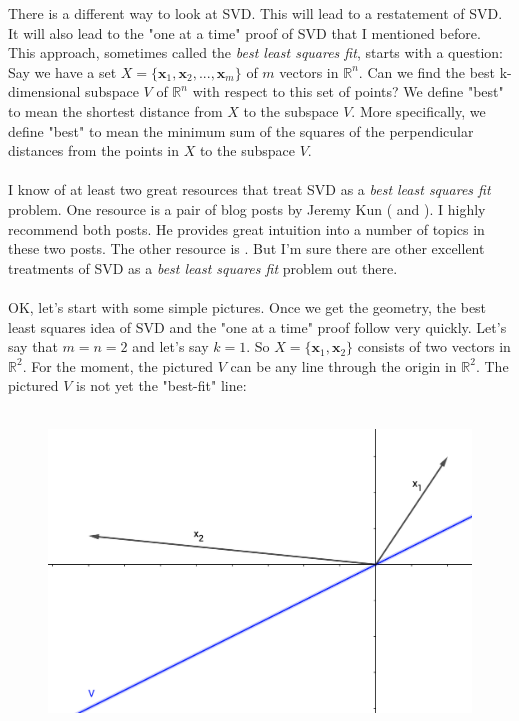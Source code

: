 \documentclass{tufte-handout}
\newcommand{\Waynehref}[3][blue]{\href{#2}{\color{#1}{#3}}}%
\begin{document}
\noindent There is a different way to look at SVD. This will lead to a restatement of SVD. It will also lead to the "one at a time" proof of SVD that I mentioned before. This approach, sometimes called the \textit{best least squares fit}, starts with a question: Say we have a set $X=\{\mathbf{x}_1, \mathbf{x}_2, ..., \mathbf{x}_m\}$ of $m$ vectors in $\mathbb{R}^n$. Can we find the best k-dimensional subspace $V$ of $\mathbb{R}^n$ with respect to this set of points? We define "best" to mean the shortest distance from $X$ to the subspace $V$. More specifically, we define "best" to mean the minimum sum of the squares of the perpendicular distances from the points in $X$ to the subspace $V$.\\\leavevmode\\

\noindent I know of at least two great resources that treat SVD as a \textit{best least squares fit} problem. One resource is a pair of blog posts by Jeremy Kun (\Waynehref{https://jeremykun.com/2016/04/18/singular-value-decomposition-part-1-perspectives-on-linear-algebra/}{SVD 1} and \Waynehref{https://jeremykun.com/2016/05/16/singular-value-decomposition-part-2-theorem-proof-algorithm/}{SVD 2}). I highly recommend both posts. He provides great intuition into a number of topics in these two posts. The other resource is \Waynehref{https://www.cs.princeton.edu/courses/archive/spring12/cos598C/svdchapter.pdf}{here}. But I'm sure there are other excellent treatments of SVD  as a \textit{best least squares fit} problem out there.\\\leavevmode\\

\noindent OK, let's start with some simple pictures. Once we get the geometry, the best least squares idea of SVD and the "one at a time" proof follow very quickly. Let's say that $m=n=2$ and let's say $k=1$. So $X=\{\mathbf{x}_1, \mathbf{x}_2\}$ consists of two vectors in $\mathbb{R}^2$. For the moment, the pictured $V$ can be any line through the origin in $\mathbb{R}^2$. The pictured $V$ is not yet the "best-fit" line: \\\leavevmode\\
\begin{figure}
	\centering
	\includegraphics[width=0.7\linewidth]{svd-pic-01}
	\caption{}
	\label{fig:svd-pic-01}
\end{figure}
\end{document}

